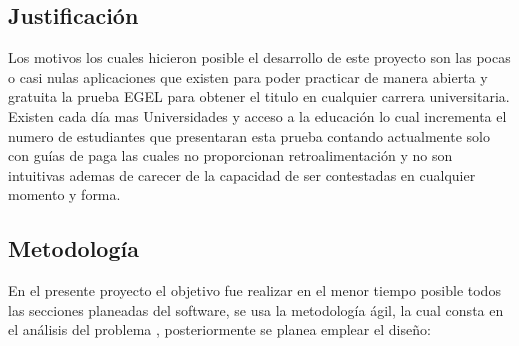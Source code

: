 \documentclass[12pt]{book}
\begin{document}
	\subsection{Justificación}
	{\normalsize 	Los motivos los cuales hicieron posible el desarrollo de este proyecto son las pocas o casi nulas aplicaciones que existen para poder practicar de manera abierta y gratuita la prueba EGEL para obtener el titulo en cualquier carrera universitaria. Existen cada día mas Universidades y acceso a la educación lo cual incrementa el numero de estudiantes que presentaran esta prueba contando actualmente solo con guías de paga las cuales no proporcionan retroalimentación y no son intuitivas ademas de carecer de la capacidad de ser contestadas en cualquier momento y forma.}
	
\subsection{Metodología }
	{\normalsize En el presente proyecto el objetivo fue realizar en el menor tiempo posible todos las secciones planeadas del software, se usa la metodología ágil, la cual consta en  el análisis del problema , posteriormente se planea emplear el diseño:}
\end{document}
